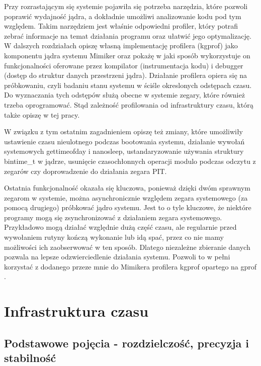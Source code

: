 \documentclass[shortabstract]{iithesis}
\theoremstyle{definition} \newtheorem*{definition}{Definicja}
\theoremstyle{definition} \newtheorem*{example}{Przykład}
\theoremstyle{definition} \newtheorem*{remark}{Uwaga}
\begin{document}
Przy rozrastającym się systemie pojawiła się potrzeba narzędzia, które pozwoli poprawić wydajność jądra, a dokładnie umożliwi analizowanie kodu pod tym względem. Takim narzędziem jest właśnie odpowiedni profiler, który potrafi zebrać informacje na temat działania programu oraz ułatwić jego optymalizację. W dalszych rozdziałach opiszę własną implementację profilera (kgprof) jako komponentu jądra systemu Mimiker oraz pokażę w jaki sposób wykorzystuje on funkcjonalności oferowane przez kompilator (instrumentacja kodu) i  debugger (dostęp do struktur danych przestrzeni jądra). Działanie profilera opiera się na próbkowaniu, czyli badaniu stanu systemu w ściśle okreslonych odstępach czasu. Do wyznaczania tych odstępów służą obecne w systemie zegary, które również trzeba oprogramować. Stąd zależność profilowania od infrastruktury czasu, którą także opiszę w tej pracy.

W związku z tym ostatnim zagadnieniem opiszę też zmiany, które umożliwiły ustawienie czasu nieulotnego podczas bootowania systemu, działanie wywołań systemowych gettimeofday i nanosleep, ustandaryzowanie używania struktury bintime\_t w jądrze, usunięcie czasochłonnych operacji modulo podczas odczytu z zegarów czy doprowadzenie do działania zegara PIT. 

Ostatnia funkcjonalność okazała się kluczowa, ponieważ dzięki dwóm sprawnym zegarom w systemie, można asynchronicznie względem zegara systemowego (za pomocą drugiego) próbkować jądro systemu. Jest to o tyle kluczowe, że niektóre programy mogą się zsynchronizować z działaniem zegara systemowego. Przykładowo mogą działać względnie dużą część czasu, ale regularnie przed wywołaniem rutyny kończą wykonanie lub idą spać, przez co nie mamy możliwości ich zaobserwować w ten sposób. Dlatego niezależne zbieranie danych pozwala na lepsze odzwierciedlenie działania systemu. Pozwoli to w pełni korzystać z dodanego przeze mnie do Mimikera profilera kgprof opartego na gprof \cite{bib:gprof}. 

\chapter{Infrastruktura czasu}

\section{Podstawowe pojęcia - rozdzielczość, precyzja i stabilność}
\end{document}
